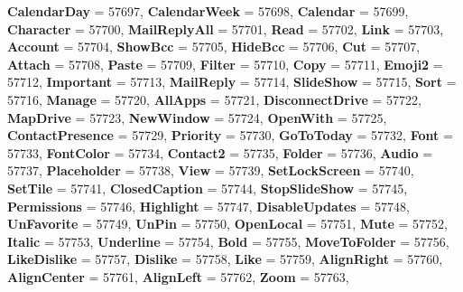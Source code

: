 \begin{DoxyCompactItemize}
{\bfseries Calendar\+Day} = 57697, 
\newline
{\bfseries Calendar\+Week} = 57698, 
{\bfseries Calendar} = 57699, 
{\bfseries Character} = 57700, 
{\bfseries Mail\+Reply\+All} = 57701, 
\newline
{\bfseries Read} = 57702, 
{\bfseries Link} = 57703, 
{\bfseries Account} = 57704, 
{\bfseries Show\+Bcc} = 57705, 
\newline
{\bfseries Hide\+Bcc} = 57706, 
{\bfseries Cut} = 57707, 
{\bfseries Attach} = 57708, 
{\bfseries Paste} = 57709, 
\newline
{\bfseries Filter} = 57710, 
{\bfseries Copy} = 57711, 
{\bfseries Emoji2} = 57712, 
{\bfseries Important} = 57713, 
\newline
{\bfseries Mail\+Reply} = 57714, 
{\bfseries Slide\+Show} = 57715, 
{\bfseries Sort} = 57716, 
{\bfseries Manage} = 57720, 
\newline
{\bfseries All\+Apps} = 57721, 
{\bfseries Disconnect\+Drive} = 57722, 
{\bfseries Map\+Drive} = 57723, 
{\bfseries New\+Window} = 57724, 
\newline
{\bfseries Open\+With} = 57725, 
{\bfseries Contact\+Presence} = 57729, 
{\bfseries Priority} = 57730, 
{\bfseries Go\+To\+Today} = 57732, 
\newline
{\bfseries Font} = 57733, 
{\bfseries Font\+Color} = 57734, 
{\bfseries Contact2} = 57735, 
{\bfseries Folder} = 57736, 
\newline
{\bfseries Audio} = 57737, 
{\bfseries Placeholder} = 57738, 
{\bfseries View} = 57739, 
{\bfseries Set\+Lock\+Screen} = 57740, 
\newline
{\bfseries Set\+Tile} = 57741, 
{\bfseries Closed\+Caption} = 57744, 
{\bfseries Stop\+Slide\+Show} = 57745, 
{\bfseries Permissions} = 57746, 
\newline
{\bfseries Highlight} = 57747, 
{\bfseries Disable\+Updates} = 57748, 
{\bfseries Un\+Favorite} = 57749, 
{\bfseries Un\+Pin} = 57750, 
\newline
{\bfseries Open\+Local} = 57751, 
{\bfseries Mute} = 57752, 
{\bfseries Italic} = 57753, 
{\bfseries Underline} = 57754, 
\newline
{\bfseries Bold} = 57755, 
{\bfseries Move\+To\+Folder} = 57756, 
{\bfseries Like\+Dislike} = 57757, 
{\bfseries Dislike} = 57758, 
\newline
{\bfseries Like} = 57759, 
{\bfseries Align\+Right} = 57760, 
{\bfseries Align\+Center} = 57761, 
{\bfseries Align\+Left} = 57762, 
\newline
{\bfseries Zoom} = 57763, 

\end{DoxyCompactItemize}
